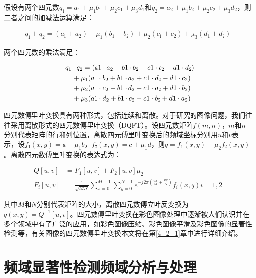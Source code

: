假设有两个四元数$q_{1}=a_{1}+\mu_{1}b_{1}+\mu_{2}c_{1}+\mu_{3}d_{1}$和$q_{2}=a_{2}+\mu_{1}b_{2}+\mu_{2}c_{2}+\mu_{3}d_{2}$，则二者之间的加减法运算满足：
\begin{linenomath}
\begin{align}
q_{1}\pm q_{2}=(a_{1}\pm a_{2})+\mu_{1}(b_{1}\pm b_{2})+\mu_{2}(c_{1}\pm c_{2})+\mu_{3}(d_{1}\pm d_{2})
\label{式2_31}
\end{align}
\end{linenomath}
两个四元数的乘法满足：
\begin{linenomath}
\begin{align}
\lefteqn{ q_{1}\cdot q_{2}=(a{1}\cdot a_{2}-b{1}\cdot b_{2}-c{1}\cdot c_{2}-d{1}\cdot d_{2}) {}}\nonumber\\
&& {}+\mu_{1}(a{1}\cdot b_{2}+b{1}\cdot a_{2}+c{1}\cdot d_{2}-d{1}\cdot c_{2})\nonumber\\
&& {}+\mu_{2}(a{1}\cdot c_{2}-b{1}\cdot d_{2}+c{1}\cdot a_{2}+d{1}\cdot b_{2})\nonumber\\
&& {}+\mu_{3}(a{1}\cdot d_{2}+b{1}\cdot c_{2}-c{1}\cdot b_{2}+d{1}\cdot a_{2})
\label{式2_32}
\end{align}
\end{linenomath}

四元数傅里叶变换具有两种形式，包括连续和离散。对于研究的图像问题，我们往往采用离散形式的四元数傅里叶变换（DQFT）。设四元数矩阵$f(m,n)$，$m$和$n$分别代表矩阵的行和列位置，离散四元傅里叶变换后的频域坐标分别用$u$和$v$表示，设$f_{1}(x,y)=a+\mu_{1} b$，$f_{2}(x,y)=c+\mu_{1} d$，则$q=f_{1}(x,y)+\mu_{2}f_{2}(x,y)$。离散四元数傅里叶变换的表达式为：
\begin{linenomath}
\begin{align}
Q[u,v] &= F_{1}[u,v]+F_{2}[u,v]\mu_{2}\label{式2_33}\\
F_{i}[u,v] &= \frac{1}{\sqrt{MN}}\sum_{x=0}^{M-1}\sum_{y=0}^{N-1}e^{-j2\pi (\frac{ux}{M}+\frac{vy}{N})}f_{i}(x,y)  i=1,2\label{式2_34}
\end{align}
\end{linenomath}
其中$M$和$N$分别代表矩阵的大小，离散四元数傅立叶反变换为$q(x,y)=Q^{-1}[u,v]$。四元数傅里叶变换在彩色图像处理中逐渐被人们认识并在多个领域中有了广泛的应用，如彩色图像压缩、彩色图像平滑及彩色图像的显著性检测等，有关图像的四元数傅里叶变换本文将在第\ref{4_2_1}章中进行详细介绍。
\section{频域显著性检测频域分析与处理}
\label{2_3}

